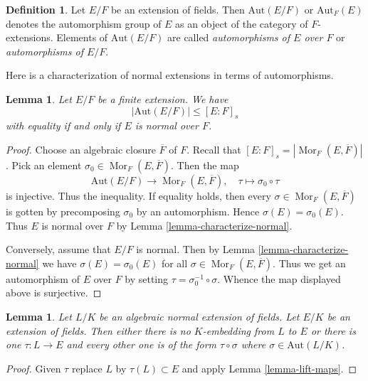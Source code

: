 \documentclass{stacks-project}
\theoremstyle{plain}
\newtheorem{lemma}[subsection]{Lemma}
\theoremstyle{definition}
\newtheorem{definition}[subsection]{Definition}
\theoremstyle{remark}
\numberwithin{equation}{subsection}
\def\Mor{\mathop{\mathrm{Mor}}\nolimits}
\begin{document}
\begin{definition}
\label{definition-automorphisms}
Let $E/F$ be an extension of fields. Then $\text{Aut}(E/F)$ or
$\text{Aut}_F(E)$ denotes the automorphism group of $E$ as an object
of the category of $F$-extensions. Elements of $\text{Aut}(E/F)$
are called {\it automorphisms of $E$ over $F$} or
{\it automorphisms of $E/F$}.
\end{definition}

\noindent
Here is a characterization of normal extensions in terms of automorphisms.

\begin{lemma}
\label{lemma-normal-and-automorphisms}
Let $E/F$ be a finite extension. We have
$$
|\text{Aut}(E/F)| \leq [E : F]_s
$$
with equality if and only if $E$ is normal over $F$.
\end{lemma}

\begin{proof}
Choose an algebraic closure $\overline{F}$ of $F$. Recall that
$[E : F]_s = |\Mor_F(E, \overline{F})|$. Pick an element
$\sigma_0 \in \Mor_F(E, \overline{F})$. Then the map
$$
\text{Aut}(E/F) \longrightarrow \Mor_F(E, \overline{F}),\quad
\tau \longmapsto \sigma_0 \circ \tau
$$
is injective. Thus the inequality. If equality holds, then
every $\sigma \in \Mor_F(E, \overline{F})$ is gotten by precomposing
$\sigma_0$ by an automorphism. Hence $\sigma(E) = \sigma_0(E)$.
Thus $E$ is normal over $F$ by Lemma \ref{lemma-characterize-normal}.

\medskip\noindent
Conversely, assume that $E/F$ is normal. Then by
Lemma \ref{lemma-characterize-normal} we have $\sigma(E) = \sigma_0(E)$
for all $\sigma \in \Mor_F(E, \overline{F})$.
Thus we get an automorphism of $E$ over $F$ by setting
$\tau = \sigma_0^{-1} \circ \sigma$. Whence the map displayed above
is surjective.
\end{proof}

\begin{lemma}
\label{lemma-normal-embeddings-differ-by-aut}
Let $L/K$ be an algebraic normal extension of fields.
Let $E/K$ be an extension of fields. Then either
there is no $K$-embedding from $L$ to $E$ or
there is one $\tau : L \to E$ and every other
one is of the form $\tau \circ \sigma$ where $\sigma \in \text{Aut}(L/K)$.
\end{lemma}

\begin{proof}
Given $\tau$ replace $L$ by $\tau(L) \subset E$ and apply
Lemma \ref{lemma-lift-maps}.
\end{proof}
\end{document}

